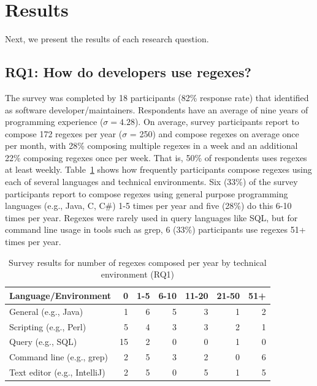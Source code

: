 \section{Results}
\label{sec:results}



Next, we present the results of each research question.

\subsection{RQ1: How do developers use regexes?}
\label{rq1:survey}
The survey was completed by 18 participants (82\% response rate) that identified as software developer/maintainers.
Respondents have an average of nine years of programming experience ($\sigma = 4.28$).
On average, survey participants report to compose 172 regexes per year ($\sigma$ = 250) and compose regexes on average once per month, with 28\% composing multiple regexes in a week and an additional 22\% composing regexes once per week. That is, 50\% of respondents uses regexes at least weekly.
Table~\ref{tab:regexenviron} shows how frequently participants compose regexes using each of several languages and technical environments.
Six (33\%) of the survey participants report to compose regexes using general purpose programming languages (e.g., Java, C, C\#) 1-5 times per year and five (28\%) do this 6-10 times per year.  Regexes were rarely used in query languages like SQL, but for command line usage in tools such as grep, 6 (33\%) participants use regexes 51+ times per year.

\newcommand{\horiz}{\hspace{2.1pt}}

\begin{table}[t]
\caption{Survey results for number of regexes composed per year by technical environment (RQ1) \label{tab:regexenviron}}
\begin{center}
\begin{small}
\begin{tabular}{l | r @{  \horiz} r @{ \horiz } r @{ \horiz } r @{ \horiz } r @{ \horiz } r }
\toprule
\textbf{Language/Environment} & 0 & 1-5 & 6-10 & 11-20 & 21-50 & 51+ \\  \hline \bigstrut
General  (e.g., Java)  & 1 & 6 & 5 & 3& 1& 2 \\ \hline \bigstrut
Scripting  (e.g., Perl) &5 &4 &3 &3 &2  &1 \\ \hline \bigstrut
Query  (e.g., SQL) & 15&2 &0 &0 &1  & 0\\ \hline \bigstrut
Command line (e.g., grep)   &2 &5 &3 &2 &0  &6 \\ \hline \bigstrut
Text editor (e.g., IntelliJ)   & 2& 5& 0& 5& 1& 5\\
\bottomrule
\end{tabular}
\end{small}
\end{center}
\vspace{-12pt}
\end{table}


